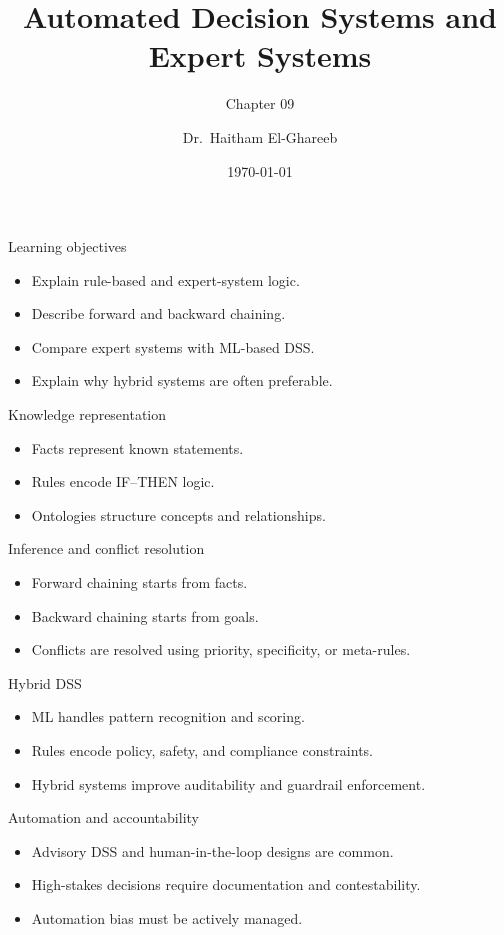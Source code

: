 \documentclass[aspectratio=169,11pt]{beamer}
\title[Expert Systems]{Automated Decision Systems and Expert Systems}
\subtitle{Chapter 09}
\author{Dr.\ Haitham El-Ghareeb}
\institute{Faculty of Computers and Information Sciences}
\date{\today}
\begin{document}
\begin{frame}
  \titlepage
\end{frame}

\begin{frame}{Learning objectives}
  \begin{itemize}
    \item Explain rule-based and expert-system logic.
    \item Describe forward and backward chaining.
    \item Compare expert systems with ML-based DSS.
    \item Explain why hybrid systems are often preferable.
  \end{itemize}
\end{frame}

\begin{frame}{Knowledge representation}
  \begin{itemize}
    \item Facts represent known statements.
    \item Rules encode IF--THEN logic.
    \item Ontologies structure concepts and relationships.
  \end{itemize}
\end{frame}

\begin{frame}{Inference and conflict resolution}
  \begin{itemize}
    \item Forward chaining starts from facts.
    \item Backward chaining starts from goals.
    \item Conflicts are resolved using priority, specificity, or meta-rules.
  \end{itemize}
\end{frame}

\begin{frame}{Hybrid DSS}
  \begin{itemize}
    \item ML handles pattern recognition and scoring.
    \item Rules encode policy, safety, and compliance constraints.
    \item Hybrid systems improve auditability and guardrail enforcement.
  \end{itemize}
\end{frame}

\begin{frame}{Automation and accountability}
  \begin{itemize}
    \item Advisory DSS and human-in-the-loop designs are common.
    \item High-stakes decisions require documentation and contestability.
    \item Automation bias must be actively managed.
  \end{itemize}
\end{frame}
\end{document}
